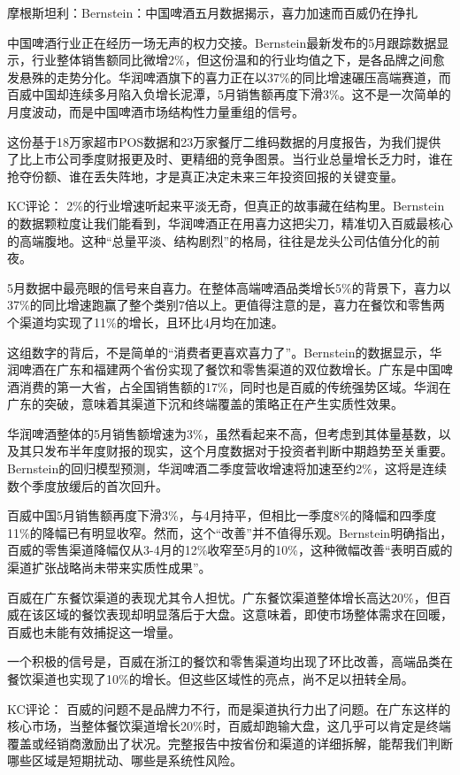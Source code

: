 \documentclass[11pt]{ctexart}
\begin{document}
摩根斯坦利：Bernstein：中国啤酒五月数据揭示，喜力加速而百威仍在挣扎

中国啤酒行业正在经历一场无声的权力交接。Bernstein最新发布的5月跟踪数据显示，行业整体销售额同比微增2\%，但这份温和的行业均值之下，是各品牌之间愈发悬殊的走势分化。华润啤酒旗下的喜力正在以37\%的同比增速碾压高端赛道，而百威中国却连续多月陷入负增长泥潭，5月销售额再度下滑3\%。这不是一次简单的月度波动，而是中国啤酒市场结构性力量重组的信号。

这份基于18万家超市POS数据和23万家餐厅二维码数据的月度报告，为我们提供了比上市公司季度财报更及时、更精细的竞争图景。当行业总量增长乏力时，谁在抢夺份额、谁在丢失阵地，才是真正决定未来三年投资回报的关键变量。

KC评论： 2\%的行业增速听起来平淡无奇，但真正的故事藏在结构里。Bernstein的数据颗粒度让我们能看到，华润啤酒正在用喜力这把尖刀，精准切入百威最核心的高端腹地。这种“总量平淡、结构剧烈”的格局，往往是龙头公司估值分化的前夜。

5月数据中最亮眼的信号来自喜力。在整体高端啤酒品类增长5\%的背景下，喜力以37\%的同比增速跑赢了整个类别7倍以上。更值得注意的是，喜力在餐饮和零售两个渠道均实现了11\%的增长，且环比4月均在加速。

这组数字的背后，不是简单的“消费者更喜欢喜力了”。Bernstein的数据显示，华润啤酒在广东和福建两个省份实现了餐饮和零售渠道的双位数增长。广东是中国啤酒消费的第一大省，占全国销售额的17\%，同时也是百威的传统强势区域。华润在广东的突破，意味着其渠道下沉和终端覆盖的策略正在产生实质性效果。

华润啤酒整体的5月销售额增速为3\%，虽然看起来不高，但考虑到其体量基数，以及其只发布半年度财报的现实，这个月度数据对于投资者判断中期趋势至关重要。Bernstein的回归模型预测，华润啤酒二季度营收增速将加速至约2\%，这将是连续数个季度放缓后的首次回升。

百威中国5月销售额再度下滑3\%，与4月持平，但相比一季度8\%的降幅和四季度11\%的降幅已有明显收窄。然而，这个“改善”并不值得乐观。Bernstein明确指出，百威的零售渠道降幅仅从3-4月的12\%收窄至5月的10\%，这种微幅改善“表明百威的渠道扩张战略尚未带来实质性成果”。

百威在广东餐饮渠道的表现尤其令人担忧。广东餐饮渠道整体增长高达20\%，但百威在该区域的餐饮表现却明显落后于大盘。这意味着，即使市场整体需求在回暖，百威也未能有效捕捉这一增量。

一个积极的信号是，百威在浙江的餐饮和零售渠道均出现了环比改善，高端品类在餐饮渠道也实现了10\%的增长。但这些区域性的亮点，尚不足以扭转全局。

KC评论： 百威的问题不是品牌力不行，而是渠道执行力出了问题。在广东这样的核心市场，当整体餐饮渠道增长20\%时，百威却跑输大盘，这几乎可以肯定是终端覆盖或经销商激励出了状况。完整报告中按省份和渠道的详细拆解，能帮我们判断哪些区域是短期扰动、哪些是系统性风险。
\end{document}
